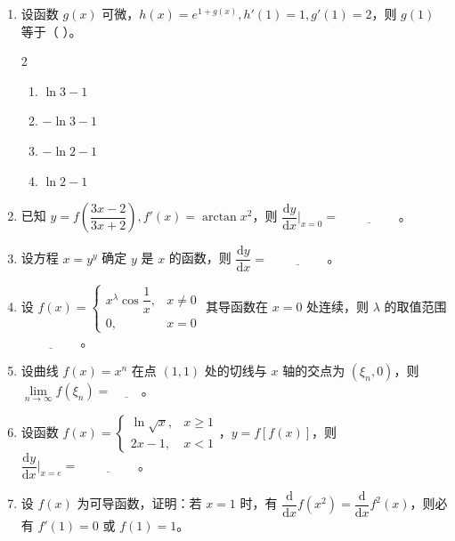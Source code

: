 \begin{enumerate}[label=\textbf{\arabic*.}, itemsep=4.5cm]
    \item 设函数 $g(x)$ 可微，$h(x) = e^{1+g(x)}, h'(1) = 1, g'(1) = 2$，则 $g(1)$ 等于（ \quad ）。
    \begin{multicols}{2}
        \begin{enumerate}[label=(\Alph*)]
            \item $\ln 3 - 1$
            \item $-\ln 3 - 1$
            \item $-\ln 2 - 1$
            \item $\ln 2 - 1$
        \end{enumerate}
    \end{multicols}

    \item 已知 $y = f\left( \dfrac{3x-2}{3x+2} \right), f'(x) = \arctan x^2$，则 $\dfrac{\mathrm{d}y}{\mathrm{d}x} \bigg|_{x=0} = \underline{\hspace{2cm}}$。

    \item 设方程 $x = y^y$ 确定 $y$ 是 $x$ 的函数，则 $\dfrac{\mathrm{d}y}{\mathrm{d}x} = \underline{\hspace{2cm}}$。

    \item 设 $f(x) = \begin{cases} x^\lambda \cos \dfrac{1}{x}, & x \neq 0 \\ 0, & x = 0 \end{cases}$ 其导函数在 $x=0$ 处连续，则 $\lambda$ 的取值范围 $\underline{\hspace{2cm}}$。

\newpage

    \item 设曲线 $f(x) = x^n$ 在点 $(1, 1)$ 处的切线与 $x$ 轴的交点为 $(\xi_n, 0)$，则 $\lim\limits_{n \to \infty} f(\xi_n) = \underline{\hspace{1cm}}$。

    \item 设函数 $f(x) = \begin{cases} \ln \sqrt{x}, & x \ge 1 \\ 2x - 1, & x < 1 \end{cases}$，$y = f[f(x)]$，则 $\dfrac{\mathrm{d}y}{\mathrm{d}x} \bigg|_{x=e} = \underline{\hspace{2cm}}$。

    \item 设 $f(x)$ 为可导函数，证明：若 $x=1$ 时，有 $\dfrac{\mathrm{d}}{\mathrm{d}x} f(x^2) = \dfrac{\mathrm{d}}{\mathrm{d}x} f^2(x)$，则必有 $f'(1) = 0$ 或 $f(1) = 1$。


\end{enumerate}
